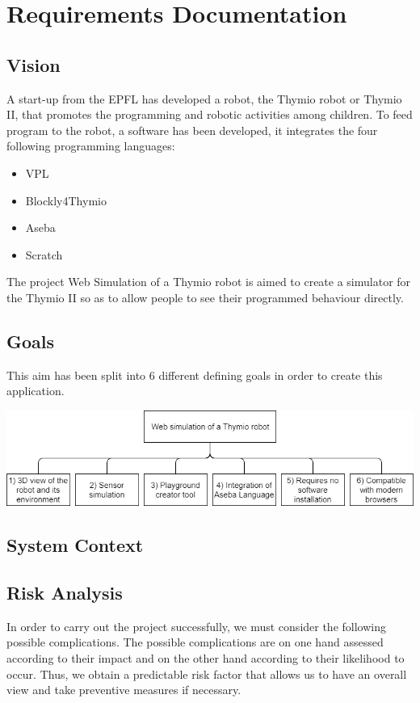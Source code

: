 \documentclass{scrbook}
\begin{document}
\chapter{Requirements Documentation}
\section{Vision}

A start-up from the EPFL has developed a robot, the Thymio robot or Thymio II, that promotes the programming and robotic activities among children. 
To feed program to the robot, a software has been developed, it integrates the four following programming languages: 
\begin{itemize}
  \item VPL
  \item Blockly4Thymio
  \item Aseba
  \item Scratch
\end{itemize}

The project Web Simulation of a Thymio robot is aimed to create a simulator for the Thymio II so as to allow people to see their programmed behaviour directly.

\section{Goals}

This aim has been split into 6 different defining goals in order to create this application.
\begin{center}
  \includegraphics[width=\textwidth]{./goals}
\end{center}

\section{System Context}
\section{Risk Analysis}
In order to carry out the project successfully, we must consider the following possible complications. The possible complications are on one hand assessed according to their impact and on the other hand according to their likelihood to occur. 
Thus, we obtain a predictable risk factor that allows us to have an overall view and take preventive measures if necessary.
\end{document}
